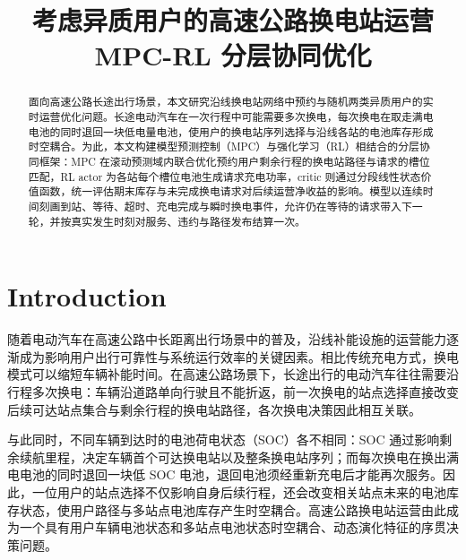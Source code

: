 \documentclass[12pt,a4paper,UTF8]{ctexart}
\begin{document}
\cover

\newpage
\begin{abstract}

面向高速公路长途出行场景，本文研究沿线换电站网络中预约与随机两类异质用户的实时运营优化问题。长途电动汽车在一次行程中可能需要多次换电，每次换电在取走满电电池的同时退回一块低电量电池，使用户的换电站序列选择与沿线各站的电池库存形成时空耦合。为此，本文构建模型预测控制（MPC）与强化学习（RL）相结合的分层协同框架：MPC 在滚动预测域内联合优化预约用户剩余行程的换电站路径与请求的槽位匹配，RL actor 为各站每个槽位电池生成请求充电功率，critic 则通过分段线性状态价值函数，统一评估期末库存与未完成换电请求对后续运营净收益的影响。模型以连续时间刻画到站、等待、超时、充电完成与瞬时换电事件，允许仍在等待的请求带入下一轮，并按真实发生时刻对服务、违约与路径发布结算一次。

\end{abstract}
\newpage

\thispagestyle{empty} %

\newpage
\tableofcontents

\newpage

\begin{center}
   \title{ \Huge \textbf{{考虑异质用户的高速公路换电站运营 MPC-RL 分层协同优化}}}
\end{center}


\section{Introduction}
随着电动汽车在高速公路中长距离出行场景中的普及，沿线补能设施的运营能力逐渐成为影响用户出行可靠性与系统运行效率的关键因素。相比传统充电方式，换电模式可以缩短车辆补能时间。在高速公路场景下，长途出行的电动汽车往往需要沿行程多次换电：车辆沿道路单向行驶且不能折返，前一次换电的站点选择直接改变后续可达站点集合与剩余行程的换电站路径，各次换电决策因此相互关联。

与此同时，不同车辆到达时的电池荷电状态（SOC）各不相同：SOC 通过影响剩余续航里程，决定车辆首个可达换电站以及整条换电站序列；而每次换电在换出满电电池的同时退回一块低 SOC 电池，退回电池须经重新充电后才能再次服务。因此，一位用户的站点选择不仅影响自身后续行程，还会改变相关站点未来的电池库存状态，使用户路径与多站点电池库存产生时空耦合。高速公路换电站运营由此成为一个具有用户车辆电池状态和多站点电池状态时空耦合、动态演化特征的序贯决策问题。
\end{document}
